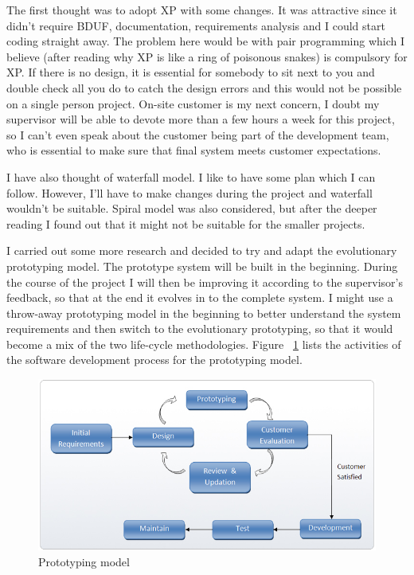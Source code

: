 \documentclass[]{report}
\begin{document}
The first thought was to adopt XP with some changes. It was attractive since it didn't require BDUF, documentation, requirements analysis and I could start coding straight away. The problem here would be with pair programming which I believe (after reading why XP is like a ring of poisonous snakes) is compulsory for XP. If there is no design, it is essential for somebody to sit next to you and double check all you do to catch the design errors and this would not be possible on a single person project. On-site customer is my next concern, I doubt my supervisor will be able to devote more than a few hours a week for this project, so I can't even speak about the customer being part of the development team, who is essential to make sure that final system meets customer expectations.

I have also thought of waterfall model. I like to have some plan which I can follow. However, I'll have to make changes during the project and waterfall wouldn't be suitable. Spiral model was also considered, but after the deeper reading I found out that it might not be suitable for the smaller projects.

I carried out some more research and decided to try and adapt the evolutionary prototyping model. The prototype system will be built in the beginning. During the course of the project I will then be improving it according to the supervisor's feedback, so that at the end it evolves in to the complete system. I might use a throw-away prototyping model in the beginning to better understand the system requirements and then switch to the evolutionary prototyping, so that it would become a mix of the two life-cycle methodologies. Figure ~\ref{fig:Evolutionary_Prototyping} lists the activities of the software development process for the prototyping model. 

\begin{figure}[H]
\centering
\centerline{\includegraphics[scale=0.55]{./prototype_methodology}}
\caption{Prototyping model \cite{Evolutionary_Prototyping}}
\label{fig:Evolutionary_Prototyping}
\end{figure}
\end{document}
